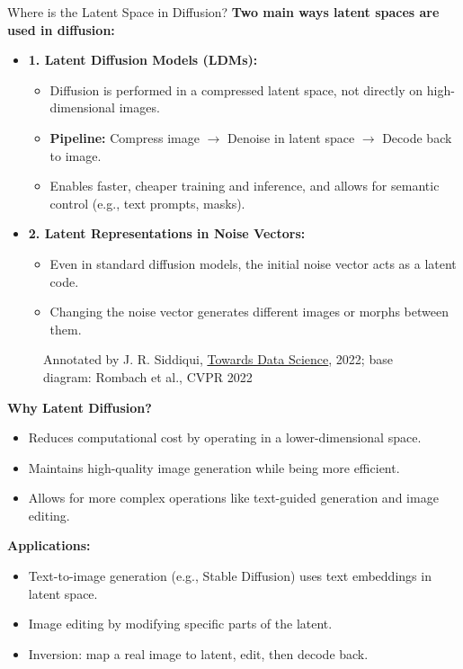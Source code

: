 \begin{frame}[allowframebreaks]{Where is the Latent Space in Diffusion?}
    \textbf{Two main ways latent spaces are used in diffusion:}
        \begin{itemize}
            \item \textbf{1. Latent Diffusion Models (LDMs):}
            \begin{itemize}
                \item Diffusion is performed in a compressed latent space, not directly on high-dimensional images.
                \item \textbf{Pipeline:} Compress image $\rightarrow$ Denoise in latent space $\rightarrow$ Decode back to image.
                \item Enables faster, cheaper training and inference, and allows for semantic control (e.g., text prompts, masks).
            \end{itemize}
            \item \textbf{2. Latent Representations in Noise Vectors:}
            \begin{itemize}
                \item Even in standard diffusion models, the initial noise vector acts as a latent code.
                \item Changing the noise vector generates different images or morphs between them.
            \end{itemize}
        \end{itemize}
\framebreak
    \begin{figure}
        \centering
        \caption*{\scriptsize Annotated by J. R. Siddiqui, \href{https://towardsdatascience.com/what-are-stable-diffusion-models-and-why-are-they-a-step-forward-for-image-generation-aa1182801d46/}{Towards Data Science}, 2022; base diagram: Rombach et al., CVPR 2022}
    \end{figure}
\framebreak
    \textbf{Why Latent Diffusion?}
    \begin{itemize}
        \item Reduces computational cost by operating in a lower-dimensional space.
        \item Maintains high-quality image generation while being more efficient.
        \item Allows for more complex operations like text-guided generation and image editing.
    \end{itemize}
\framebreak
    \textbf{Applications:}
        \begin{itemize}
            \item Text-to-image generation (e.g., Stable Diffusion) uses text embeddings in latent space.
            \item Image editing by modifying specific parts of the latent.
            \item Inversion: map a real image to latent, edit, then decode back.
        \end{itemize}
\end{frame}

